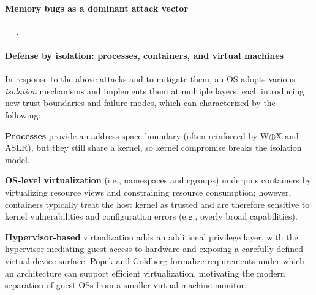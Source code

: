 \paragraph{\textbf{Memory bugs as a dominant attack vector}}
~
~.

\paragraph{\textbf{Defense by isolation: processes, containers, and virtual machines}}
In response to the above attacks and to mitigate them, an OS adopts various \textit{isolation} mechanisms and implements them at multiple layers, each introducing new trust boundaries and failure modes, which can characterized by the following:
\begin{myitemize}
  \item  
  \textbf{Processes} provide an address-space boundary (often reinforced by W$\oplus$X and ASLR), but they still share a kernel, so kernel compromise breaks the isolation model. 
  
  \item 
  \textbf{OS-level virtualization} (i.e., namespaces and cgroups) underpins containers by virtualizing resource views and constraining resource consumption; however, containers typically treat the host kernel as trusted and are therefore sensitive to kernel vulnerabilities and configuration errors (e.g., overly broad capabilities). 

  \item 
  \textbf{Hypervisor-based} virtualization adds an additional privilege layer, with the hypervisor mediating guest access to hardware and exposing a carefully defined virtual device surface. 
  Popek and Goldberg formalize requirements under which an architecture can support efficient virtualization, motivating the modern separation of guest OSs from a smaller virtual machine monitor\cite{popek1974formal}.
  ~.



\end{myitemize} 



